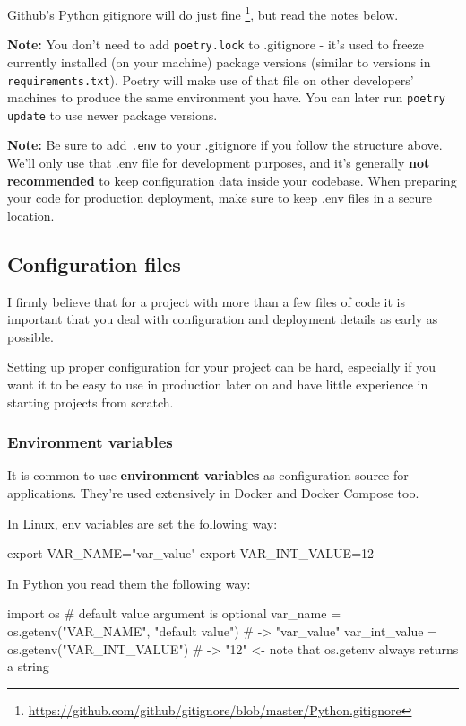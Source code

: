 \documentclass{article}
\newcommand{\flink}[1]{\footnote{\href{#1}{#1}}}
\newcommand{\note}{\textbf{\color{red}Note: }}
\newcommand{\bashinline}[1]{\lstinline[language=bash, style=cstyle, morekeywords={docker, poetry, git, mv, python, uvicorn}, basicstyle=\ttfamily\normalsize]{#1}}
\begin{document}
Github's Python gitignore will do just fine \flink{https://github.com/github/gitignore/blob/master/Python.gitignore}, but read the notes below.

\note You don't need to add \texttt{poetry.lock} to .gitignore - it's used to freeze currently installed (on your machine) package versions (similar to versions in \texttt{requirements.txt}). Poetry will make use of that file on other developers' machines to produce the same environment you have. You can later run \bashinline{poetry update} to use newer package versions.

\note Be sure to add \texttt{.env} to your .gitignore if you follow the structure above. We'll only use that .env file for development purposes, and it's generally \textbf{not recommended} to keep configuration data inside your codebase. When preparing your code for production deployment, make sure to keep .env files in a secure location.

\subsection{Configuration files}

I firmly believe that for a project with more than a few files of code it is important that you deal with configuration and deployment details as early as possible.

Setting up proper configuration for your project can be hard, especially if you want it to be easy to use in production later on and have little experience in starting projects from scratch.

\subsubsection{Environment variables}

It is common to use \textbf{environment variables} as configuration source for applications. They're used extensively in Docker and Docker Compose too.

In Linux, env variables are set the following way:

\begin{bashcode}
export VAR_NAME="var_value"
export VAR_INT_VALUE=12
\end{bashcode}

In Python you read them the following way:

\begin{pycode}
import os
# default value argument is optional
var_name = os.getenv("VAR_NAME", "default value") # -> "var_value"
var_int_value = os.getenv("VAR_INT_VALUE") # -> "12" <- note that os.getenv always returns a string
\end{pycode}
\end{document}
